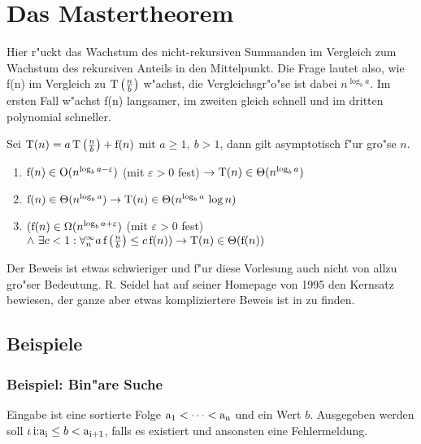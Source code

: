 \documentclass[draft,12pt]{scrreprt}
\theoremstyle{break}
\begin{document}
\section{Das Mastertheorem}
Hier r"uckt das Wachstum des nicht-rekursiven Summanden im Vergleich zum Wachstum des rekursiven Anteils in den Mittelpunkt. Die Frage
lautet also, wie f(n) im Vergleich zu \(\textup{T}\left(\frac{n}{b}\right)\) w"achst, die Vergleichsgr"o"se ist dabei \(n^{\log_ba}\).
Im ersten Fall w"achst f(n) langsamer, im zweiten gleich schnell und im dritten polynomial schneller.

Sei \(\textup{T}(n)=a\,\textup{T}\left(\frac{n}{b}\right)+\textup{f}(n)\) mit \( a \geq 1,\ b > 1\), 
dann gilt asymptotisch f"ur gro"se $n$.

\begin{enumerate}
\item \(\textup{f}(n) \in \textup{O}(n^{\log_ba-\varepsilon} ) \) (mit \(\varepsilon > 0\) fest) \(\rightarrow \textup{T}(n) \in\Theta(n^{\log_ba})\)

\item \(\textup{f}(n) \in\Theta(n^{\log_ba}) \rightarrow \textup{T}(n) \in\Theta(n^{\log_ba}\, \log n)\)

\item \((\textup{f}(n) \in\Omega(n^{\log_ba+\varepsilon} ) \) (mit \( \varepsilon > 0 \) fest)
\(\wedge\ \exists c < 1 : \forall^{\infty}_{n}
a \, \textup{f}\left(\frac{n}{b}\right)  \leq c \, \textup{f}(n)) \rightarrow \textup{T}(n) \in \Theta(\textup{f}(n))\)
\end{enumerate}

Der Beweis ist etwas schwieriger und f"ur diese Vorlesung auch nicht von allzu gro"ser Bedeutung. R. Seidel hat auf seiner Homepage
von 1995 den Kernsatz bewiesen, der ganze aber etwas kompliziertere Beweis ist in \cite{cormen} zu finden. 

\subsection{Beispiele}
\subsubsection{Beispiel: Bin"are Suche} 

Eingabe ist eine sortierte Folge \(\textup{a}_1 < \dots < \textup{a}_{\textup{n}}\) und ein Wert $b$. Ausgegeben werden soll
\(\iota \, \textup{i:a}_{\textup{i}} \leq b < \textup{a}_{\textup{i+1}}\), falls es existiert und ansonsten eine Fehlermeldung.
\bigskip
\end{document}
